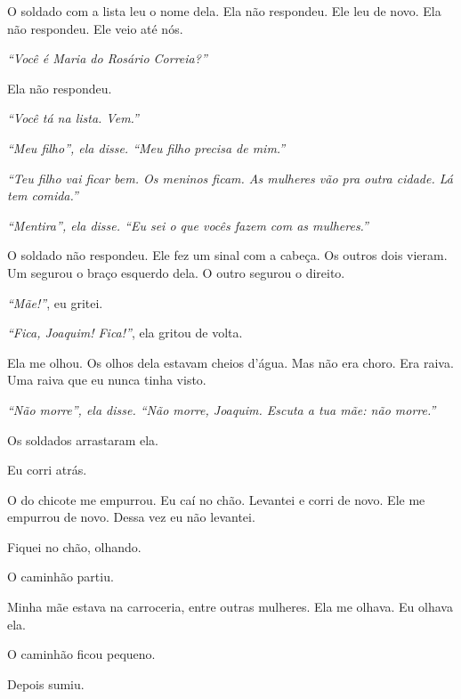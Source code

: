 \noindent O soldado com a lista leu o nome dela. Ela não respondeu. Ele leu de novo. Ela não respondeu. Ele veio até nós.

\noindent \textit{\textquotedblleft{}Você é Maria do Rosário Correia?\textquotedblright{}}

\noindent Ela não respondeu.

\noindent \textit{\textquotedblleft{}Você tá na lista. Vem.\textquotedblright{}}

\noindent \textit{\textquotedblleft{}Meu filho\textquotedblright{}\textit{, ela disse. }\textquotedblleft{}Meu filho precisa de mim.\textquotedblright{}}

\noindent \textit{\textquotedblleft{}Teu filho vai ficar bem. Os meninos ficam. As mulheres vão pra outra cidade. Lá tem comida.\textquotedblright{}}

\noindent \textit{\textquotedblleft{}Mentira\textquotedblright{}\textit{, ela disse. }\textquotedblleft{}Eu sei o que vocês fazem com as mulheres.\textquotedblright{}}

\noindent O soldado não respondeu. Ele fez um sinal com a cabeça. Os outros dois vieram. Um segurou o braço esquerdo dela. O outro segurou o direito.

\noindent \textit{\textquotedblleft{}Mãe!\textquotedblright{}}, eu gritei.

\noindent \textit{\textquotedblleft{}Fica, Joaquim! Fica!\textquotedblright{}}, ela gritou de volta.

\noindent Ela me olhou. Os olhos dela estavam cheios d'água. Mas não era choro. Era raiva. Uma raiva que eu nunca tinha visto.

\noindent \textit{\textquotedblleft{}Não morre\textquotedblright{}\textit{, ela disse. }\textquotedblleft{}Não morre, Joaquim. Escuta a tua mãe: não morre.\textquotedblright{}}

\noindent Os soldados arrastaram ela.

\noindent Eu corri atrás.

\noindent O do chicote me empurrou. Eu caí no chão. Levantei e corri de novo. Ele me empurrou de novo. Dessa vez eu não levantei.

\noindent Fiquei no chão, olhando.

\noindent O caminhão partiu.

\noindent Minha mãe estava na carroceria, entre outras mulheres. Ela me olhava. Eu olhava ela.

\noindent O caminhão ficou pequeno.

\noindent Depois sumiu.

